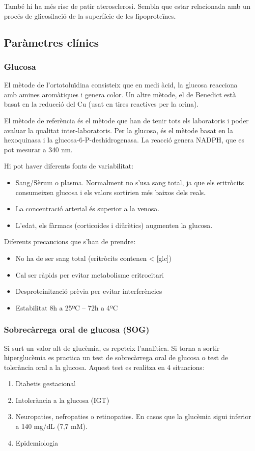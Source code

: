 També hi ha més risc de patir aterosclerosi. Sembla que estar
relacionada amb un procés de glicosilació de la superfície de les
lipoproteïnes.

\subsection{Paràmetres clínics}
\label{sec:parametres-clinics}

\subsubsection{Glucosa}
\label{sec:glucosa}
El mètode de l'ortotoluïdina consisteix que en medi àcid, la glucosa
reacciona amb amines aromàtiques i genera color. Un altre mètode, el
de Benedict està basat en la reducció del Cu (usat en tires reactives per la orina).

El mètode de referència és el mètode que han de tenir tots els
laboratoris i poder avaluar la qualitat inter-laboratoris. Per la
glucosa, és el mètode basat en la hexoquinasa i la
glucosa-6-P-deshidrogenasa. La reacció genera NADPH, que es pot
mesurar a 340 nm.

Hi pot haver diferents fonts de variabilitat:
\begin{itemize}
\item Sang/Sèrum o plasma. Normalment no s'usa sang total, ja que els
  eritròcits consumeixen glucosa i els valors sortirien més baixos
  dels reals.
\item La concentració arterial és superior a la venosa.
\item L'edat, els fàrmacs (corticoides i diürètics) augmenten la
  glucosa.
\end{itemize}

Diferents precaucions que s'han de prendre:
\begin{itemize}
\item No ha de ser sang total (eritròcits contenen < [glc])
\item Cal ser ràpids per evitar metabolisme eritrocitari
\item Desproteinització prèvia per evitar interferències
\item Estabilitat 8h a 25ºC – 72h a 4ºC
\end{itemize}

\subsubsection{Sobrecàrrega oral de glucosa (SOG)}
\label{sec:sobrecarrega-oral-de}
Si surt un valor alt de glucèmia, es repeteix l'analítica. Si torna a
sortir hiperglucèmia es practica un test de sobrecàrrega oral de
glucosa o test de tolerància oral a la glucosa. Aquest test es
realitza en 4 situacions:
\begin{enumerate}
\item Diabetis gestacional
\item Intolerància a la glucosa (IGT)
\item Neuropaties, nefropaties o retinopaties. En casos que la
  glucèmia sigui inferior a 140 mg/dL (7,7 mM).
\item Epidemiologia
\end{enumerate}

